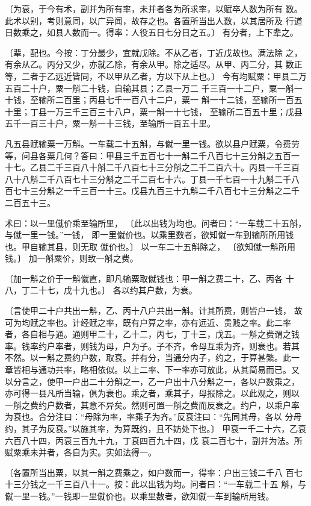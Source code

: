 \documentclass[a4paper,12pt,UTF8,twoside]{ctexbook}
\begin{document}
〔为衰，于今有术，副并为所有率，未并者各为所求率，以赋卒人数为所有 数。此术以别，考则意同，以广异闻，故存之也。各置所当出人数，以其居所及 行道日数乘之，如县人数而一。得率：人役五日七分日之五。〕 有分者，上下辈之。

〔辈，配也。今按：丁分最少，宜就戊除。不从乙者，丁近戊故也。满法除 之，有余从乙。丙分又少，亦就乙除，有余从甲。除之适尽。从甲、丙二分，其 数正等，二者于乙远近皆同，不以甲从乙者，方以下从上也。〕 今有均赋粟：甲县二万五百二十户，粟一斛二十钱，自输其县；乙县一万二 千三百一十二户，粟一斛一十钱，至输所二百里；丙县七千一百八十二户，粟一 斛一十二钱，至输所一百五十里；丁县一万三千三百三十八户，粟一斛一十七钱， 至输所二百五十里；戊县五千一百三十户，粟一斛一十三钱，至输所一百五十里。

凡五县赋输粟一万斛。一车载二十五斛，与僦一里一钱。欲以县户赋粟，令费劳 等，问县各粟几何？答曰：甲县三千五百七十一斛二千八百七十三分斛之五百一 十七。乙县二千三百八十斛二千八百七十三分斛之二千二百六十。丙县一千三百 八十八斛二千八百七十三分斛之二千二百七十六。丁县一千七百一十九斛二千八 百七十三分斛之一千三百一十三。戊县九百三十九斛二千八百七十三分斛之二千 二百五十三。

术曰：以一里僦价乘至输所里， 〔此以出钱为均也。问者曰：“一车载二十五斛，与僦一里一钱。”一钱， 即一里僦价也。以乘里数者，欲知僦一车到输所所用钱也。甲自输其县，则无取 僦价也。〕 以一车二十五斛除之， 〔欲知僦一斛所用钱。〕 加一斛粟价，则致一斛之费。

〔加一斛之价于一斛僦直，即凡输粟取僦钱也：甲一斛之费二十，乙、丙各 十八，丁二十七，戊十九也。〕 各以约其户数，为衰。

〔言使甲二十户共出一斛，乙、丙十八户共出一斛。计其所费，则皆户一钱， 故可为均赋之率也。计经赋之率，既有户算之率，亦有远近、贵贱之率。此二率 者，各自相与通。通则甲二十，乙十二，丙七，丁十三，戊五。一斛之费谓之钱 率。钱率约户率者，则钱为母，户为子。子不齐，令母互乘为齐，则衰也。若其 不然。以一斛之费约户数，取衰。并有分，当通分内子，约之，于算甚繁。此一 章皆相与通功共率，略相依似。以上二率、下一率亦可放此，从其简易而已。又 以分言之，使甲一户出二十分斛之一，乙一户出十八分斛之一，各以户数乘之， 亦可得一县凡所当输，俱为衰也。乘之者，乘其子，母报除之。以此观之，则以 一斛之费约户数者，其意不异矣。然则可置一斛之费而反衰之。约户，以乘户率 为衰也。合分注曰：“母除为率，率乘子为齐。”反衰注曰：“先同其母，各以 分母约，其子为反衰。”以施其率，为算既约，且不妨处下也。〕 甲衰一千二十六，乙衰六百八十四，丙衰三百九十九，丁衰四百九十四，戊 衰二百七十，副并为法。所赋粟乘未并者，各自为实。实如法得一。

〔各置所当出粟，以其一斛之费乘之，如户数而一，得率：户出三钱二千八 百七十三分钱之一千三百八十一。按：此以出钱为均。问者曰：“一车载二十五 斛，与僦一里一钱。”一钱即一里僦价也。以乘里数者，欲知僦一车到输所用钱。
\end{document}
